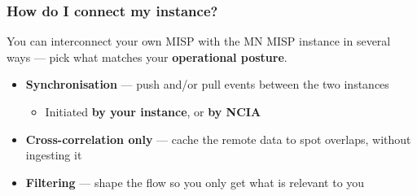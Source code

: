 \begin{frame}
    \frametitle{How do I connect my instance?}

    You can interconnect your own MISP with the MN MISP instance in several ways ---
    pick what matches your \textbf{operational posture}.

    \vspace{0.5em}

    \begin{itemize}
        \item \textbf{Synchronisation} --- push and/or pull events between the two instances
            \begin{itemize}
                \item[] Initiated \textbf{by your instance}, or \textbf{by NCIA}
            \end{itemize}
        \item \textbf{Cross-correlation only} --- cache the remote data to spot overlaps,
              without ingesting it
        \item \textbf{Filtering} --- shape the flow so you only get what is relevant to you
    \end{itemize}

    \vspace{0.5em}

\end{frame}


